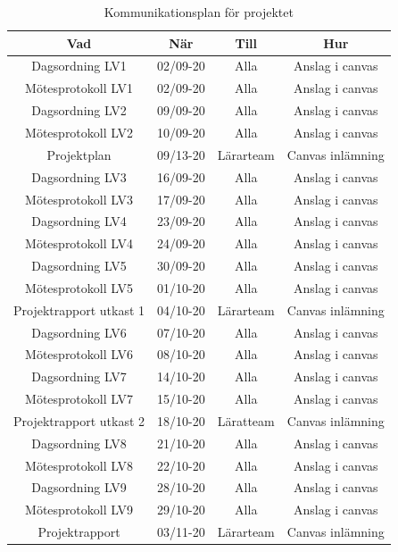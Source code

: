 \documentclass[a4paper]{article}
\begin{document}
\begin{table}[H]
    \centering
    \begin{tabular}{ |c|c|c|c| }\hline
     Vad & När & Till & Hur \\\hline
     Dagsordning LV1 & 02/09-20 & Alla & Anslag i canvas \\\hline
     Mötesprotokoll LV1 & 02/09-20 & Alla & Anslag i canvas \\\hline
     Dagsordning LV2 & 09/09-20 & Alla & Anslag i canvas \\\hline
     Mötesprotokoll LV2 & 10/09-20 & Alla & Anslag i canvas \\\hline
     Projektplan & 09/13-20 & Lärarteam & Canvas inlämning \\\hline 
     Dagsordning LV3 & 16/09-20 & Alla & Anslag i canvas \\\hline
     Mötesprotokoll LV3 & 17/09-20 & Alla & Anslag i canvas \\\hline
     Dagsordning LV4 & 23/09-20 & Alla & Anslag i canvas \\\hline
     Mötesprotokoll LV4 & 24/09-20 & Alla & Anslag i canvas \\\hline
     Dagsordning LV5 & 30/09-20 & Alla & Anslag i canvas \\\hline
     Mötesprotokoll LV5 & 01/10-20 & Alla & Anslag i canvas \\\hline
     Projektrapport utkast 1 & 04/10-20 & Lärarteam & Canvas inlämning \\\hline
     Dagsordning LV6 & 07/10-20 & Alla & Anslag i canvas \\\hline
     Mötesprotokoll LV6 & 08/10-20 & Alla & Anslag i canvas \\\hline
     Dagsordning LV7 & 14/10-20 & Alla & Anslag i canvas \\\hline
     Mötesprotokoll LV7 & 15/10-20 & Alla & Anslag i canvas \\\hline
     Projektrapport utkast 2 & 18/10-20 & Läratteam & Canvas inlämning \\\hline
     Dagsordning LV8 & 21/10-20 & Alla & Anslag i canvas \\\hline
     Mötesprotokoll LV8 & 22/10-20 & Alla & Anslag i canvas \\\hline
     Dagsordning LV9 & 28/10-20 & Alla & Anslag i canvas \\\hline
     Mötesprotokoll LV9 & 29/10-20 & Alla & Anslag i canvas \\\hline
     Projektrapport & 03/11-20 & Lärarteam & Canvas inlämning \\\hline
    \end{tabular}
    \caption{Kommunikationsplan för projektet}
    \label{table:kommunikationsplan}
\end{table}
\end{document}
